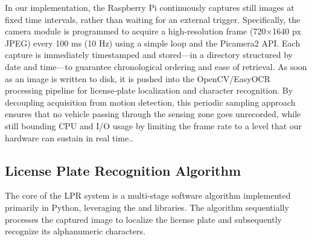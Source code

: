 In our implementation, the Raspberry Pi continuously captures still images at fixed time intervals, rather than waiting for an external trigger. Specifically, the camera module is programmed to acquire a high-resolution frame (720×1640 px JPEG) every 100 ms (10 Hz) using a simple loop and the Picamera2 API. Each capture is immediately timestamped and stored—in a directory structured by date and time—to guarantee chronological ordering and ease of retrieval. As soon as an image is written to disk, it is pushed into the OpenCV/EasyOCR processing pipeline for license‐plate localization and character recognition. By decoupling acquisition from motion detection, this periodic sampling approach ensures that no vehicle passing through the sensing zone goes unrecorded, while still bounding CPU and I/O usage by limiting the frame rate to a level that our hardware can sustain in real time..

\subsection*{License Plate Recognition Algorithm}
\label{subsec:lpr_algorithm}

The core of the LPR system is a multi-stage software algorithm implemented primarily in Python, leveraging the  and  libraries. The algorithm sequentially processes the captured image to localize the license plate and subsequently recognize its alphanumeric characters.


